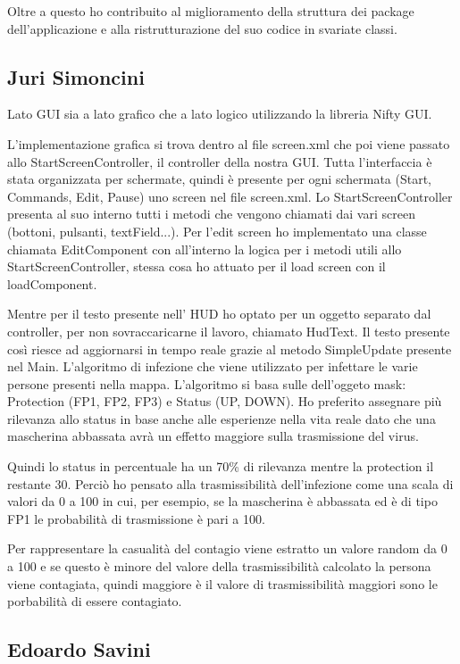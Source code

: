 \documentclass[a4paper,12pt]{report}
\begin{document}
Oltre a questo ho contribuito al miglioramento della struttura dei package dell'applicazione e alla ristrutturazione del suo codice in svariate classi.

\subsection{Juri Simoncini}
Lato GUI sia a lato grafico che a lato logico utilizzando la libreria Nifty GUI.

L'implementazione grafica si trova dentro al file screen.xml che poi viene passato allo StartScreenController, il controller della nostra GUI.
Tutta l'interfaccia è stata organizzata per schermate, quindi è presente per ogni schermata (Start, Commands, Edit, Pause) uno screen nel file screen.xml.
Lo StartScreenController presenta al suo interno tutti i metodi che vengono chiamati dai vari screen (bottoni, pulsanti, textField...).
Per l'edit screen ho implementato una classe chiamata EditComponent con all'interno la logica per i metodi utili allo StartScreenController, stessa cosa ho attuato per il load screen con il loadComponent.

Mentre per il testo presente nell' HUD ho optato per un oggetto separato dal controller, per non sovraccaricarne il lavoro, chiamato HudText.
Il testo presente così riesce ad aggiornarsi in tempo reale grazie al metodo SimpleUpdate presente nel Main.
L'algoritmo di infezione che viene utilizzato per infettare le varie persone presenti nella mappa.
L'algoritmo si basa sulle dell'oggeto mask: Protection (FP1, FP2, FP3) e Status (UP, DOWN).
Ho preferito assegnare più rilevanza allo status in base anche alle esperienze nella vita reale dato che una mascherina abbassata avrà un effetto maggiore sulla trasmissione del virus.

Quindi lo status in percentuale ha un 70\% di rilevanza mentre la protection il restante 30.
Perciò ho pensato alla trasmissibilità dell'infezione come una scala di valori da 0 a 100 in cui, per esempio, se la mascherina è abbassata ed è di tipo FP1 le probabilità di trasmissione è pari a 100.

Per rappresentare la casualità del contagio viene estratto un valore random da 0 a 100 e se questo è minore del valore della trasmissibilità calcolato la persona viene contagiata, quindi maggiore è il valore di trasmissibilità maggiori sono le porbabilità di essere contagiato.

\subsection{Edoardo Savini}
\end{document}
